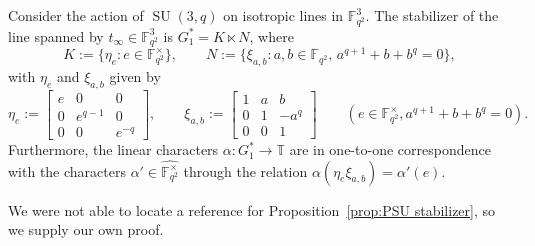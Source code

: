 \begin{proposition}
\label{prop:PSU stabilizer}
Consider the action of $\operatorname{SU}(3,q)$ on isotropic lines in $\mathbb{F}_{q^2}^3$.
The stabilizer of the line spanned by $t_\infty \in\mathbb{F}_{q^2}^3$ is $G_1^* = K \ltimes N$, where
\[ 
K := \{ \eta_e : e \in \mathbb{F}_{q^2}^\times \},
\qquad
N := \{ \xi_{a,b} : a,b \in \mathbb{F}_{q^2},\, a^{q+1} + b + b^q = 0\},
\]
with $\eta_{e}$ and $\xi_{a,b}$ given by
\[
\eta_e:=\begin{bmatrix}e & 0 & 0 \\ 0 & e^{q-1} & 0 \\ 0 & 0 & e^{-q} \end{bmatrix},
\qquad
\xi_{a,b}:=\begin{bmatrix}1 & a & b \\ 0 & 1 & -a^q \\ 0 & 0 & 1 \end{bmatrix}
\qquad
(e \in \mathbb{F}_{q^2}^\times, a^{q+1}+b+b^q = 0).
\]
Furthermore, the linear characters $\alpha\colon G_1^* \to \mathbb{T}$ are in one-to-one correspondence with the characters $\alpha'\in\widehat{\mathbb{F}_{q^2}^\times}$ through the relation $\alpha(\eta_e \xi_{a,b})=\alpha'(e)$.
\end{proposition}

We were not able to locate a reference for Proposition~\ref{prop:PSU stabilizer}, so we supply our own proof.

